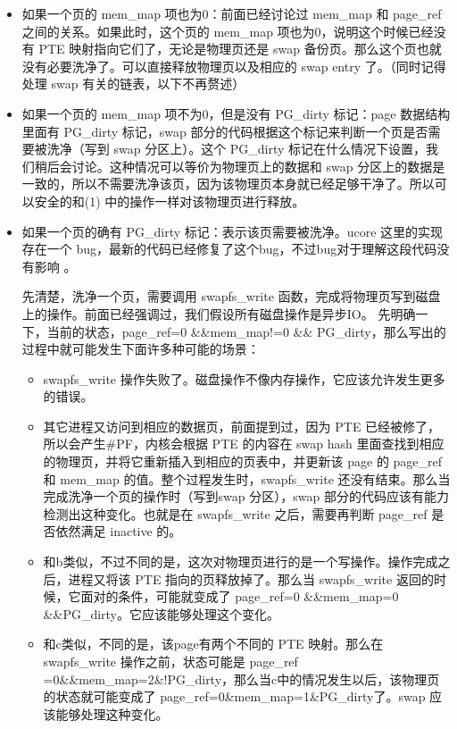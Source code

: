 \begin{itemize}
\item
  如果一个页的 mem\_map 项也为0：前面已经讨论过 mem\_map 和 page\_ref
  之间的关系。如果此时，这个页的 mem\_map 项也为0，说明这个时候已经没有
  PTE 映射指向它们了，无论是物理页还是 swap
  备份页。那么这个页也就没有必要洗净了。可以直接释放物理页以及相应的
  swap entry 了。（同时记得处理 swap 有关的链表，以下不再赘述）
\item
  如果一个页的 mem\_map 项不为0，但是没有 PG\_dirty 标记：page
  数据结构里面有 PG\_dirty 标记，swap
  部分的代码根据这个标记来判断一个页是否需要被洗净（写到 swap
  分区上）。这个 PG\_dirty
  标记在什么情况下设置，我们稍后会讨论。这种情况可以等价为物理页上的数据和
  swap
  分区上的数据是一致的，所以不需要洗净该页，因为该物理页本身就已经足够干净了。所以可以安全的和(1)
  中的操作一样对该物理页进行释放。
\item
  如果一个页的确有 PG\_dirty 标记：表示该页需要被洗净。ucore
  这里的实现存在一个
  bug，最新的代码已经修复了这个bug，不过bug对于理解这段代码没有影响 。

  先清楚，洗净一个页，需要调用 swapfs\_write
  函数，完成将物理页写到磁盘上的操作。前面已经强调过，我们假设所有磁盘操作是异步IO。
  先明确一下，当前的状态，page\_ref=0 \&\&mem\_map!=0 \&\&
  PG\_dirty，那么写出的过程中就可能发生下面许多种可能的场景：

  \begin{itemize}
  \item
    swapfs\_write
    操作失败了。磁盘操作不像内存操作，它应该允许发生更多的错误。
  \item
    其它进程又访问到相应的数据页，前面提到过，因为 PTE
    已经被修了，所以会产生\#PF，内核会根据 PTE 的内容在 swap hash
    里面查找到相应的物理页，并将它重新插入到相应的页表中，并更新该 page
    的 page\_ref 和 mem\_map 的值。整个过程发生时，swapfs\_write
    还没有结束。那么当完成洗净一个页的操作时（写到swap 分区），swap
    部分的代码应该有能力检测出这种变化。也就是在 swapfs\_write
    之后，需要再判断 page\_ref 是否依然满足 inactive 的。
  \item
    和b类似，不过不同的是，这次对物理页进行的是一个写操作。操作完成之后，进程又将该
    PTE 指向的页释放掉了。那么当 swapfs\_write
    返回的时候，它面对的条件，可能就变成了 page\_ref=0 \&\&mem\_map=0
    \&\&PG\_dirty。它应该能够处理这个变化。
  \item
    和c类似，不同的是，该page有两个不同的 PTE 映射。那么在swapfs\_write
    操作之前，状态可能是 page\_ref
    =0\&\&mem\_map=2\&!PG\_dirty，那么当c中的情况发生以后，该物理页的状态就可能变成了
    page\_ref=0\&mem\_map=1\&PG\_dirty了。swap 应该能够处理这种变化。
  \end{itemize}
\end{itemize}

